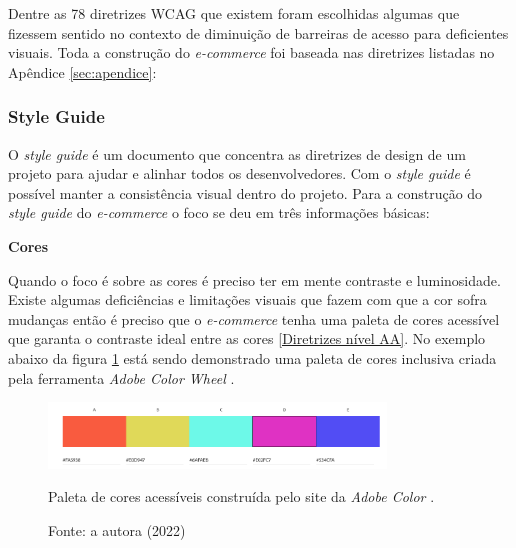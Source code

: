 {Dentre as 78 diretrizes WCAG \cite{WCAG21} que existem foram escolhidas algumas que fizessem sentido no contexto de diminuição de barreiras de acesso para deficientes visuais. Toda a construção do \textit{e-commerce} foi baseada nas diretrizes listadas no Apêndice \ref{sec:apendice}: 

}

\newpage
\subsubsection{Style Guide}
{O \textit{style guide} \cite{lynch2016web} é um documento que concentra as diretrizes de design de um projeto para ajudar e alinhar todos os desenvolvedores. Com o \textit{style guide} é possível manter a consistência visual dentro do projeto. Para a construção do \textit{style guide} do \textit{e-commerce} o foco se deu em três informações básicas:


{\textbf{Cores}}

Quando o foco é sobre as cores é preciso ter em mente contraste e luminosidade. Existe algumas deficiências e limitações visuais que fazem com que a cor sofra mudanças então é preciso que o \textit{e-commerce} tenha uma paleta de cores acessível que garanta o contraste ideal entre as cores \ref{Diretrizes nível AA}. No exemplo abaixo da figura \ref{fig1:style} está sendo demonstrado uma paleta de cores inclusiva criada pela ferramenta \textit{Adobe Color Wheel} \cite{ADOBE} . 
\begin{figure}[ht]
  		\centering
  		
        \includegraphics[width=0.8\textwidth]{images/paleta_de_cores_acessiveis.png}
        \caption{Paleta de cores acessíveis construída pelo site da \textit{Adobe Color} \cite{ADOBE}.}
        \caption*{Fonte: a autora (2022)}
        \label{fig1:style}
\end{figure}  

}
